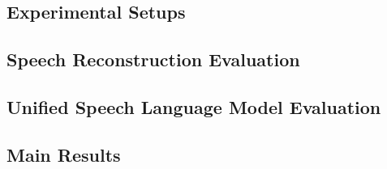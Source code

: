 


\subsection{Experimental Setups}
\label{sec:041_exp_setup}



\subsection{Speech Reconstruction Evaluation}
\label{sec:042_st_evaluation}


\subsection{Unified Speech Language Model Evaluation}
\label{sec:043_tts_evaluation}


\subsection{Main Results}
\label{sec:044_main_results}

